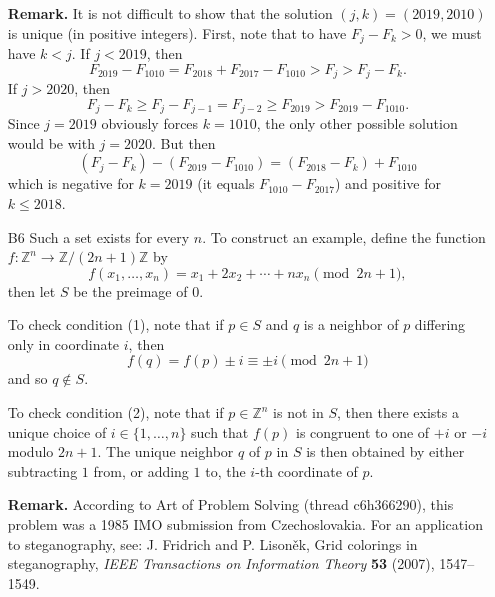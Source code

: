 \documentclass[amssymb,twocolumn,pra,10pt,aps]{revtex4-1}
\begin{document}
\begin{itemize}
\noindent
\textbf{Remark.}
It is not difficult to show that the solution $(j,k) = (2019, 2010)$ is unique (in positive integers). 
First, note that to have $F_j - F_k > 0$, we must have $k < j$.
If $j < 2019$, then
\[
F_{2019} - F_{1010} = F_{2018} + F_{2017} - F_{1010} > F_{j} > F_j - F_k.
\]
If $j > 2020$, then  
\[
F_j - F_k \geq F_j - F_{j-1} = F_{j-2} \geq F_{2019} > F_{2019} - F_{1010}.
\]
Since $j = 2019$ obviously forces $k = 1010$, the only other possible solution would be with $j = 2020$.
But then
\[
(F_j - F_k) - (F_{2019} - F_{1010})
= (F_{2018} - F_k) + F_{1010} 
\]
which is negative for $k=2019$ (it equals $F_{1010} - F_{2017}$)
and positive for $k \leq 2018$.

\item[B6]
Such a set exists for every $n$. To construct an example, define the function $f: \mathbb{Z}^n \to \mathbb{Z}/(2n+1) \mathbb{Z}$ by
\[
f(x_1,\dots,x_n) = x_1 + 2x_2 + \cdots + nx_n \pmod{2n+1},
\]
then let $S$ be the preimage of 0.

To check condition (1), note that if $p \in S$ and $q$ is a neighbor of $p$ differing only in coordinate $i$, then
\[
f(q) = f(p) \pm i \equiv \pm i \pmod{2n+1}
\]
and so $q \notin S$.

To check condition (2), note that if $p \in \mathbb{Z}^n$ is not in $S$, then there exists a unique choice of $i \in \{1,\dots,n\}$ such that $f(p)$ is congruent to one of $+i$ or $-i$ modulo $2n+1$. The unique neighbor $q$ of $p$ in $S$ is then obtained by either subtracting $1$ from, or adding $1$ to, the $i$-th coordinate of $p$.

\noindent
\textbf{Remark.}
According to Art of Problem Solving (thread c6h366290), this problem was a 1985 IMO submission from Czechoslovakia. For an application to steganography, see:
J. Fridrich and P. Lison\v{e}k, Grid colorings in steganography,
\textit{IEEE Transactions on Information Theory} \textbf{53} (2007), 1547--1549.

\end{itemize}
\end{document}
